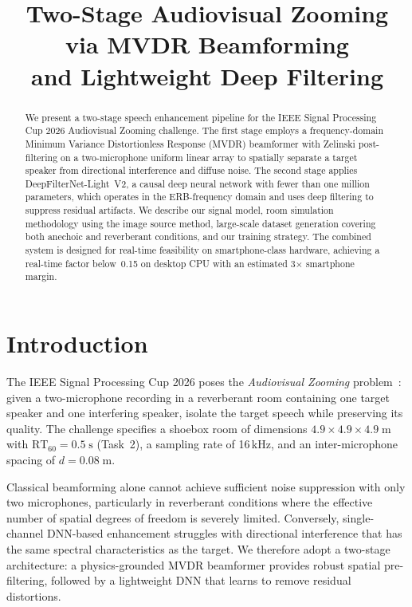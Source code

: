 \documentclass[a4paper]{article}
\title{Two-Stage Audiovisual Zooming via MVDR Beamforming\\and Lightweight Deep Filtering}
\begin{document}
\maketitle

\begin{abstract}
We present a two-stage speech enhancement pipeline for the IEEE Signal
Processing Cup 2026 Audiovisual Zooming challenge.  The first stage employs a
frequency-domain Minimum Variance Distortionless Response (MVDR) beamformer
with Zelinski post-filtering on a two-microphone uniform linear array to
spatially separate a target speaker from directional interference and diffuse
noise.  The second stage applies DeepFilterNet-Light~V2, a causal deep neural
network with fewer than one million parameters, which operates in the
ERB-frequency domain and uses deep filtering to suppress residual artifacts.
We describe our signal model, room simulation methodology using the image
source method, large-scale dataset generation covering both anechoic and
reverberant conditions, and our training strategy.  The combined system is
designed for real-time feasibility on smartphone-class hardware, achieving a
real-time factor below~0.15 on desktop CPU with an estimated 3$\times$
smartphone margin.
\end{abstract}

\section{Introduction}
\label{sec:intro}

The IEEE Signal Processing Cup 2026 poses the \emph{Audiovisual Zooming}
problem~\cite{spcup2026}: given a two-microphone recording in a reverberant
room containing one target speaker and one interfering speaker, isolate the
target speech while preserving its quality.  The challenge specifies a
shoebox room of dimensions $4.9\times4.9\times4.9\;\text{m}$ with
$\text{RT}_{60}=0.5\;\text{s}$ (Task~2), a sampling rate of 16\,kHz, and an
inter-microphone spacing of $d=0.08\;\text{m}$.

Classical beamforming alone cannot achieve sufficient noise suppression with
only two microphones, particularly in reverberant conditions where the
effective number of spatial degrees of freedom is severely limited.
Conversely, single-channel DNN-based enhancement struggles with directional
interference that has the same spectral characteristics as the target.
We therefore adopt a two-stage architecture: a physics-grounded MVDR
beamformer provides robust spatial pre-filtering, followed by a lightweight
DNN that learns to remove residual distortions.
\end{document}
